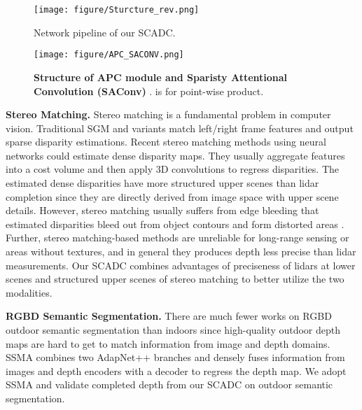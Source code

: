 \documentclass{article}
\begin{document}
\begin{figure*}[hbt!]
    \centering
    \texttt{[image: figure/Sturcture\_rev.png]}
    \vspace{-23pt}
    \caption{Network pipeline of our SCADC.}
    \label{pipeline}
    \vspace{-15pt}
\end{figure*}
\begin{figure}[bt!]
    \centering
    \texttt{[image: figure/APC\_SACONV.png]}
    \vspace{-22pt}
    \caption{\textbf{Structure of APC module and Sparisty Attentional Convolution (SAConv)} \cite{zhong2019deep}.  is for point-wise product.}
    \label{APC_SACONV}
    \vspace{-15pt}
\end{figure}

\textbf{Stereo Matching.} Stereo matching is a fundamental problem in computer vision. Traditional SGM and variants \cite{hirschmuller2007stereo,hirschmuller2005accurate,gehrig2009real,hermann2012iterative} match left/right frame features and output sparse disparity estimations. Recent stereo matching methods \cite{chang2018pyramid, Guo_2019_CVPR, Zhang_2019_CVPR} using neural networks could estimate dense disparity maps. They usually aggregate features into a cost volume and then apply 3D convolutions to regress disparities. The estimated dense disparities have more structured upper scenes than lidar completion since they are directly derived from image space with upper scene details. However, stereo matching usually suffers from edge bleeding that estimated disparities bleed out from object contours and form distorted areas \cite{forsyth2003modern,wang2014stereo}. Further, stereo matching-based methods are unreliable for long-range sensing or areas without textures, and in general they produces depth less precise than lidar measurements. Our SCADC combines advantages of preciseness of lidars at lower scenes and structured upper scenes of stereo matching to better utilize the two modalities.

\textbf{RGBD Semantic Segmentation.} There are much fewer works on RGBD outdoor semantic segmentation than indoors since high-quality outdoor depth maps are hard to get to match information from image and depth domains. SSMA \cite{valada19ijcv} combines two AdapNet++ \cite{valada19ijcv} branches and densely fuses information from images and depth encoders with a decoder to regress the depth map. We adopt SSMA and validate completed depth from our SCADC on outdoor semantic segmentation.
\end{document}
